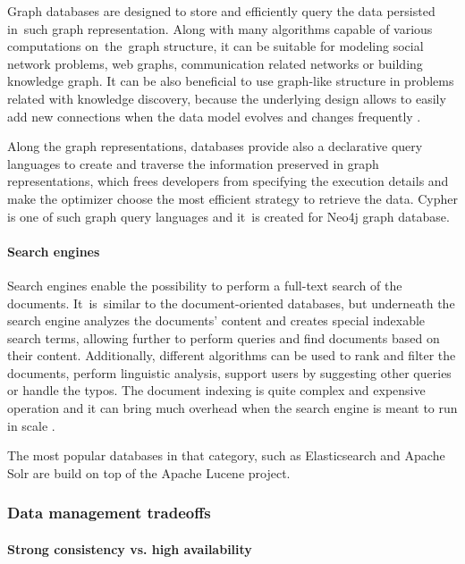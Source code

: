 Graph databases are designed to store and efficiently query the data persisted in~such graph representation. Along with many algorithms capable of various computations on~the~graph structure, it can be suitable for modeling social network problems, web graphs, communication related networks or building knowledge graph. It can be also beneficial to use graph-like structure in problems related with knowledge discovery, because the underlying design allows to easily add new connections when the data model evolves and changes frequently \cite{DesignDataIntensiveApplications}.

Along the graph representations, databases provide also a declarative query languages to create and traverse the information preserved in graph representations, which frees developers from specifying the execution details and make the optimizer choose the most efficient strategy to retrieve the data. Cypher is one of such graph query languages and it~is created for Neo4j \cite{Neo4j} graph database.

\paragraph{Search engines}

Search engines enable the possibility to perform a full-text search of the documents. It~is~similar to the document-oriented databases, but underneath the search engine analyzes the documents' content and creates special indexable search terms, allowing further to perform queries and find documents based on their content. Additionally, different algorithms can be used to rank and filter the documents, perform linguistic analysis, support users by suggesting other queries or handle the typos. The document indexing is quite complex and expensive operation and it can bring much overhead when the search engine is meant to run in scale \cite{DesignDataIntensiveApplications}. 

The most popular databases in that category, such as Elasticsearch \cite{Elasticsearch} and Apache Solr \cite{ApacheSolr} are build on top of the Apache Lucene project.

\subsubsection{Data management tradeoffs} \label{chapter:database-management-tradeoffs}

\paragraph{Strong consistency vs. high availability}

